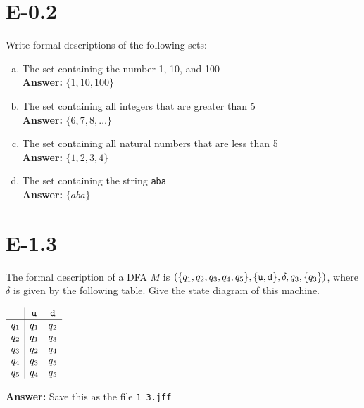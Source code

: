 \documentclass{article}
\begin{document}
\section*{E-0.2}
Write formal descriptions of the following sets:
\begin{enumerate}[a.]
\item The set containing the number 1, 10, and 100\\
{\bf Answer: } $\{1,10,100\}$

\item The set containing all integers that are greater than 5\\
{\bf Answer: } $\{6,7,8,\dots\}$

\item The set containing all natural numbers that are less than 5\\
{\bf Answer: } $\{1,2,3,4\}$

\item The set containing the string \verb=aba=\\
{\bf Answer: } $\{aba\}$

\end{enumerate}

\section*{E-1.3}

The formal description of a DFA $M$ is $(\{q_1, q_2, q_3, q_4, q_5\}, \{{\tt u}, {\tt d}\},
\delta, q_3, \{q_3\})$,
where $\delta$ is given by the following table.
Give the state diagram of this machine.
\begin{center}
$\begin{array}{c|cc}
     & {\tt u} & {\tt d}\\
\hline
q_1  & q_1     & q_2\\
q_2  & q_1     & q_3\\
q_3  & q_2     & q_4\\
q_4  & q_3     & q_5\\
q_5  & q_4     & q_5
\end{array}
$
\end{center}

{\bf Answer: } Save this as the file \verb=1_3.jff=
\end{document}
